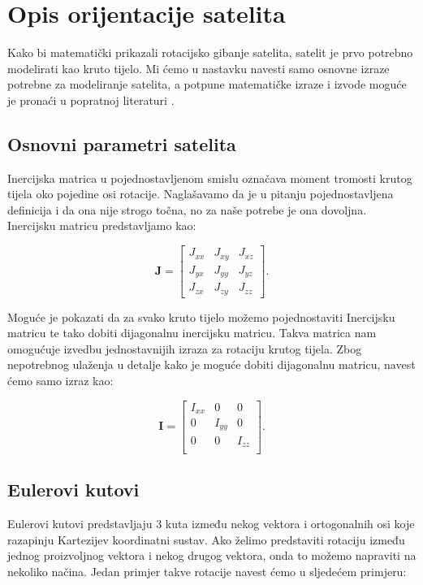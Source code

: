 \documentclass[times, utf8, diplomski, numeric]{templates/template}
\begin{document}
\chapter{Opis orijentacije satelita}{
    Kako bi matematički prikazali rotacijsko gibanje satelita, satelit je prvo potrebno modelirati kao kruto tijelo. Mi ćemo u nastavku navesti samo osnovne izraze potrebne za modeliranje satelita, a potpune matematičke izraze i izvode moguće je pronaći u popratnoj literaturi \cite{adcsKnjiga}.

    \section{Osnovni parametri satelita}{
        Inercijska matrica  u pojednostavljenom smislu označava moment tromosti krutog tijela oko pojedine osi rotacije. Naglašavamo da je u pitanju pojednostavljena definicija i da ona nije strogo točna, no za naše potrebe je ona dovoljna. Inercijsku matricu predstavljamo kao:

        \begin{equation}
        \textbf{J} = 
        \begin{bmatrix}
            J_{xx} & J_{xy} & J_{xz} \\
            J_{yx} & J_{yy} & J_{yz} \\
            J_{zx} & J_{zy} & J_{zz}
        \end{bmatrix}
        .
        \end{equation}

        Moguće je pokazati da za svako kruto tijelo možemo pojednostaviti Inercijsku matricu te tako dobiti dijagonalnu inercijsku matricu. Takva matrica nam omogućuje izvedbu jednostavnijih izraza za rotaciju krutog tijela. Zbog nepotrebnog ulaženja u detalje kako je moguće dobiti dijagonalnu matricu, navest ćemo samo izraz kao:

        \begin{equation}
        \textbf{I} = 
        \begin{bmatrix}
            I_{xx} & 0      & 0 \\
            0      & I_{yy} & 0 \\
            0      & 0      & I_{zz} \\
        \end{bmatrix}
        .
        \end{equation}
    }

    \section{Eulerovi kutovi}{
        Eulerovi kutovi predstavljaju 3 kuta između nekog vektora i ortogonalnih osi koje razapinju Kartezijev koordinatni sustav. Ako želimo predstaviti rotaciju između jednog proizvoljnog vektora i nekog drugog vektora, onda to možemo napraviti na nekoliko načina. Jedan primjer takve rotacije navest ćemo u sljedećem primjeru:

}}
\end{document}
